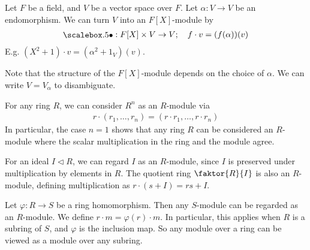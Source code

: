 \begin{example}
	Let $F$ be a field, and $V$ be a vector space over $F$.
	Let $\alpha : V \to V$ be an endomorphism.
	We can turn $V$ into an $F[X]$-module by
	\begin{align*}
		\bigcdot : F[X] \times V \to V;\quad f \cdot v = (f(\alpha))(v)
	\end{align*}
	E.g. $(X^2 + 1) \cdot v = (\alpha^2 + 1_V)(v)$.

	Note that the structure of the $F[X]$-module depends on the choice of $\alpha$.
	We can write $V = V_\alpha$ to disambiguate.
\end{example} 

\begin{example}
	For any ring $R$, we can consider $R^n$ as an $R$-module via
	\begin{align*}
		r \cdot (r_1, \dots, r_n) = (r \cdot r_1, \dots, r \cdot r_n)
	\end{align*}
	In particular, the case $n = 1$ shows that any ring $R$ can be considered an $R$-module where the scalar multiplication in the ring and the module agree.
\end{example} 

\begin{example}
	For an ideal $I \triangleleft R$, we can regard $I$ as an $R$-module, since $I$ is preserved under multiplication by elements in $R$.
	The quotient ring $\faktor{R}{I}$ is also an $R$-module, defining multiplication as $r \cdot (s+I) = rs + I$.
\end{example} 

\begin{example}
	Let $\varphi : R \to S$ be a ring homomorphism.
	Then any $S$-module can be regarded as an $R$-module.
	We define $r \cdot m = \varphi(r) \cdot m$.
	In particular, this applies when $R$ is a subring of $S$, and $\varphi$ is the inclusion map.
	So any module over a ring can be viewed as a module over any subring.
\end{example} 

